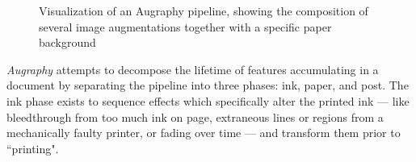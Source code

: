 \documentclass[runningheads]{llncs}
\begin{document}
\begin{figure}
\centering
{}
\caption{Visualization of an Augraphy pipeline, showing the composition of several image augmentations together with a specific paper background} \label{fig:pipeline}
\end{figure}

\emph{Augraphy} attempts to decompose the lifetime of features accumulating in a document by separating the pipeline into three phases: ink, paper, and post.
The ink phase exists to sequence effects which specifically alter the printed ink --- like bleedthrough from too much ink on page, extraneous lines or regions from a mechanically faulty printer, or fading over time --- and transform them prior to ``printing".
\end{document}
